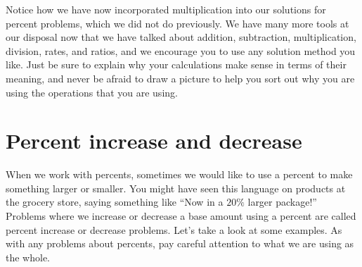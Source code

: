 \documentclass{ximera}
\begin{document}
Notice how we have now incorporated multiplication into our solutions for percent problems, which we did not do previously. We have many more tools at our disposal now that we have talked about addition, subtraction, multiplication, division, rates, and ratios, and we encourage you to use any solution method you like. Just be sure to explain why your calculations make sense in terms of their meaning, and never be afraid to draw a picture to help you sort out why you are using the operations that you are using.



\section{Percent increase and decrease}

When we work with percents, sometimes we would like to use a percent to make something larger or smaller. You might have seen this language on products at the grocery store, saying something like ``Now in a $20\%$ larger package!'' Problems where we increase or decrease a base amount using a percent are called percent increase or decrease problems. Let's take a look at some examples. As with any problems about percents, pay careful attention to what we are using as the whole. 
\end{document}
